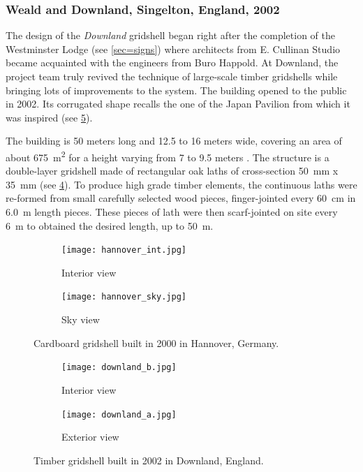 \subsubsection{Weald and Downland, Singelton, England, 2002}
The design of the \emph{Downland} gridshell began right after the completion of the Westminster Lodge (see \cref{sec=signs}) where architects from E. Cullinan Studio became acquainted with the engineers from Buro Happold. At Downland, the project team truly revived the technique of large-scale timber gridshells while bringing lots of improvements to the system. The building opened to the public in 2002. Its corrugated shape recalls the one of the Japan Pavilion from which it was inspired (see \cref{fig:downland_b}).

The building is 50 meters long and 12.5 to 16 meters wide, covering an area of about \SI{675}{m^2} for a height varying from 7 to 9.5 meters \cite{Harris2002}. The structure is a double-layer gridshell made of rectangular oak laths of cross-section \SI{50}{mm} x \SI{35}{mm} (see \cref{fig:downland_a}). To produce high grade timber elements, the continuous laths were re-formed from small carefully selected wood pieces, finger-jointed every \SI{60}{cm} in \SI{6.0}{m} length pieces. These pieces of lath were then scarf-jointed on site every \SI{6}{m} to obtained the desired length, up to \SI{50}{m}.

\begin{figure}[t]
	\begin{subfigure}[b]{\TwoMediaWidth/3}
		\texttt{[image: hannover\_int.jpg]}
		\caption{Interior view}
		\label{fig:hannover_a}
	\end{subfigure}%
	\hspace{\MediaGutterWidth}%
	\begin{subfigure}[b]{2\TwoMediaWidth/3}
		\texttt{[image: hannover\_sky.jpg]}
		\caption{Sky view}
		\label{fig:hannover_b}
	\end{subfigure}
	\caption[Cardboard gridshell built in 2000 in Hannover, Germany]{Cardboard gridshell built in 2000 in Hannover, Germany.}
	\label{fig:hannover}
\end{figure}

\begin{figure}[t]
	\begin{subfigure}[b]{\TwoMediaWidth}
		\texttt{[image: downland\_b.jpg]}
		\caption{Interior view}
		\label{fig:downland_a}
	\end{subfigure}%
	\hspace{\MediaGutterWidth}%
	\begin{subfigure}[b]{\TwoMediaWidth}
		\texttt{[image: downland\_a.jpg]}
		\caption{Exterior view}
		\label{fig:downland_b}
	\end{subfigure}
	\caption[Timber gridshell built in 2002 in Downland, England]{Timber gridshell built in 2002 in Downland, England.}
	\label{fig:downland}
\end{figure}

